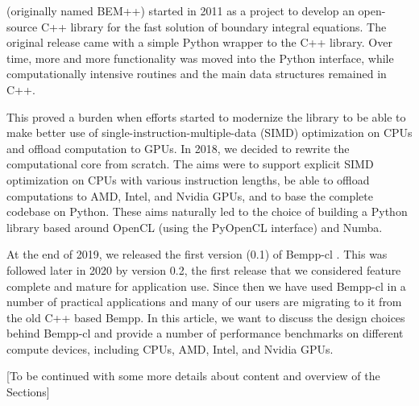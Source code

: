  (originally named BEM++) started in 2011 as a project to develop an open-source C++ library for the fast solution of boundary integral equations. The original release came with a simple Python wrapper to the C++ library. Over time, more and more functionality was moved into the Python interface, while computationally intensive routines and the main data structures remained in C++.

This proved a burden when efforts started to modernize the library to be able to make better use of single-instruction-multiple-data (SIMD) optimization on CPUs and offload computation to GPUs. In 2018, we decided to rewrite the computational core from scratch. The aims were to support explicit SIMD optimization on CPUs with various instruction lengths, be able to offload computations to AMD, Intel, and Nvidia GPUs, and to base the complete codebase on Python. These aims naturally led to the choice of building a Python library based around OpenCL (using the PyOpenCL interface) and Numba.

At the end of 2019, we released the first version (0.1) of Bempp-cl \cite{Bempp-cl}. This was followed later in 2020 by version 0.2, the first release that we considered feature complete and mature for application use. Since then we have used Bempp-cl in a number of practical applications and many of our users are migrating to it from the old C++ based Bempp. In this article, we want to discuss the design choices behind Bempp-cl and provide a number of performance benchmarks on different compute devices, including CPUs, AMD, Intel, and Nvidia GPUs.

[To be continued with some more details about content and overview of the Sections]
